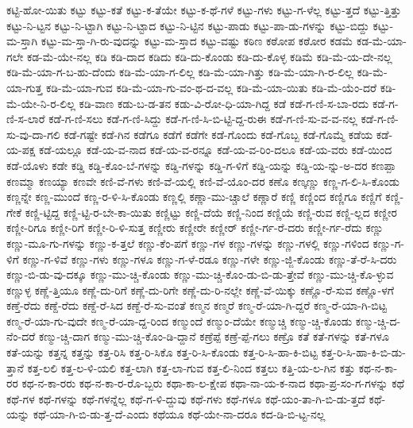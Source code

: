 {ಕಟ್ಟಿ-ಹೋ-ಯಿತು
ಕಟ್ಟು
ಕಟ್ಟು-ಕತೆ
ಕಟ್ಟು-ಕ-ತೆಯೇ
ಕಟ್ಟು-ಕ-ಥೆ-ಗಳೆ
ಕಟ್ಟು-ಗಳು
ಕಟ್ಟು-ಗ-ಳೆಲ್ಲ
ಕಟ್ಟು-ತ್ತದೆ
ಕಟ್ಟು-ತ್ತಿತ್ತು
ಕಟ್ಟು-ನಿ-ಟ್ಟನ
ಕಟ್ಟು-ನಿ-ಟ್ಟಾಗಿ
ಕಟ್ಟು-ನಿ-ಟ್ಟಾದ
ಕಟ್ಟು-ನಿ-ಟ್ಟಿನ
ಕಟ್ಟು-ಪಾಡು
ಕಟ್ಟು-ಪಾ-ಡು-ಗಳನ್ನು
ಕಟ್ಟು-ಬಿದ್ದು
ಕಟ್ಟು-ಮ-ಸ್ತಾಗಿ
ಕಟ್ಟು-ಮ-ಸ್ತಾ-ಗಿ-ರು-ವುದನ್ನು
ಕಟ್ಟು-ಮ-ಸ್ತಾದ
ಕಟ್ಟು-ವಷ್ಟು
ಕಠಿಣ
ಕಠೋಪ
ಕಠೋರ
ಕಡಮೆ
ಕಡ-ಮೆ-ಯಾ-ಗಲೇ
ಕಡ-ಮೆ-ಯೇ-ನಲ್ಲ
ಕಡಿ
ಕಡಿ-ದಾದ
ಕಡಿದು
ಕಡಿ-ದು-ಕೊಂಡು
ಕಡಿ-ದು-ಕೊಳ್ಳ
ಕಡಿಮೆ
ಕಡಿ-ಮೆ-ಯ-ದೇ-ನಲ್ಲ
ಕಡಿ-ಮೆ-ಯಾ-ಗ-ಬ-ಹು-ದೆಂದು
ಕಡಿ-ಮೆ-ಯಾ-ಗ-ಲಿಲ್ಲ
ಕಡಿ-ಮೆ-ಯಾ-ಗಿತ್ತು
ಕಡಿ-ಮೆ-ಯಾ-ಗಿ-ರ-ಲಿಲ್ಲ
ಕಡಿ-ಮೆ-ಯಾ-ಗುತ್ತ
ಕಡಿ-ಮೆ-ಯಾ-ಗುವ
ಕಡಿ-ಮೆ-ಯಾ-ಗು-ವಂ-ಥ-ದ-ವಲ್ಲ
ಕಡಿ-ಮೆ-ಯಾ-ಯಿತು
ಕಡಿ-ಮೆ-ಯೆಂ-ದರೆ
ಕಡಿ-ಮೆ-ಯೇ-ನಿ-ರ-ಲಿಲ್ಲ
ಕಡಿ-ವಾಣ
ಕಡು-ಬ-ಡ-ತನ
ಕಡು-ವಿ-ರೋ-ಧಿ-ಯಾ-ಗಿದ್ದ
ಕಡೆ
ಕಡೆ-ಗ-ಣಿ-ಸ-ಬಾ-ರದು
ಕಡೆ-ಗ-ಣಿ-ಸ-ಲಾರೆ
ಕಡೆ-ಗ-ಣಿ-ಸಲು
ಕಡೆ-ಗ-ಣಿ-ಸಿದ್ದು
ಕಡೆ-ಗ-ಣಿ-ಸಿ-ಬಿ-ಟ್ಟಿ-ದ್ದ-ರುಈ
ಕಡೆ-ಗ-ಣಿ-ಸು-ವ-ವ-ನಲ್ಲ
ಕಡೆ-ಗ-ಣಿ-ಸು-ವು-ದಾ-ಗಲಿ
ಕಡೆ-ಗಷ್ಟೇ
ಕಡೆ-ಗಿನ
ಕಡೆಗೂ
ಕಡೆಗೆ
ಕಡೆಗೇ
ಕಡೆ-ಗೊಂದು
ಕಡೆ-ಗೊಬ್ಬ
ಕಡೆ-ಗೊಮ್ಮೆ
ಕಡೆಯ
ಕಡೆ-ಯ-ಪಕ್ಷ
ಕಡೆ-ಯಲ್ಲೂ
ಕಡೆ-ಯ-ವ-ನಾದ
ಕಡೆ-ಯ-ವ-ರನ್ನೂ
ಕಡೆ-ಯ-ವ-ರಿಂ-ದಲೂ
ಕಡೆ-ಯ-ವರು
ಕಡೆ-ಯಿಂದ
ಕಡೆ-ಯೊಳು
ಕಡೇ
ಕಡ್ಡಿ
ಕಡ್ಡಿ-ಕೊಂ-ಬೆ-ಗಳನ್ನು
ಕಡ್ಡಿ-ಗಳನ್ನು
ಕಡ್ಡಿ-ಗ-ಳಿಗೆ
ಕಡ್ಡಿ-ಯನ್ನು
ಕಡ್ಡಿ-ಯ-ನ್ನು-ಅ-ದರ
ಕಣಪ್ಪಾ
ಕಣಮ್ಮಾ
ಕಣಯ್ಯಾ
ಕಣವೇ
ಕಣಿ-ವೆ-ಗಳು
ಕಣಿ-ವೆ-ಯಲ್ಲಿ
ಕಣಿ-ವೆ-ಯೊಂ-ದರ
ಕಣೊ
ಕಣ್ಕಣ್ಣು
ಕಣ್ಣ-ಗ-ಲಿ-ಸಿ-ಕೊಂಡು
ಕಣ್ಣನ್ನೇ
ಕಣ್ಣ-ಮುಂದೆ
ಕಣ್ಣ-ರ-ಳಿ-ಸಿ-ಕೊಂಡು
ಕಣ್ಣಲ್ಲಿ
ಕಣ್ಣಾ-ಮು-ಚ್ಚಾಲೆ
ಕಣ್ಣಾರೆ
ಕಣ್ಣಿ
ಕಣ್ಣಿಂದ
ಕಣ್ಣಿಗೂ
ಕಣ್ಣಿಗೆ
ಕಣ್ಣಿ-ಗೇಕೆ
ಕಣ್ಣಿ-ಟ್ಟಿದ್ದ
ಕಣ್ಣಿ-ಟ್ಟಿ-ರ-ಬೇ-ಕಾ-ಯಿತು
ಕಣ್ಣಿಟ್ಟು
ಕಣ್ಣಿ-ದೆಯೆ
ಕಣ್ಣಿ-ನಿಂದ
ಕಣ್ಣಿಯೆ
ಕಣ್ಣಿ-ರುವ
ಕಣ್ಣಿ-ಲ್ಲದ
ಕಣ್ಣೀರ
ಕಣ್ಣೀ-ರಿಗೂ
ಕಣ್ಣೀ-ರಿಗೆ
ಕಣ್ಣೀ-ರಿ-ಳಿ-ಸುತ್ತ
ಕಣ್ಣೀರು
ಕಣ್ಣೀರೇ
ಕಣ್ಣೀರ್
ಕಣ್ಣೀ-ರ್ಗ-ರೆ-ದರು
ಕಣ್ಣೀ-ರ್ಗ-ರೆದು
ಕಣ್ಣು
ಕಣ್ಣು-ಮೂ-ಗು-ಗಳನ್ನು
ಕಣ್ಣು-ಕ-ತ್ತಲೆ
ಕಣ್ಣು-ಕೆಂ-ಪಗೆ
ಕಣ್ಣು-ಗಳ
ಕಣ್ಣು-ಗಳನ್ನು
ಕಣ್ಣು-ಗಳಲ್ಲಿ
ಕಣ್ಣು-ಗಳಿಂದ
ಕಣ್ಣು-ಗ-ಳಿಗೆ
ಕಣ್ಣು-ಗ-ಳಿವೆ
ಕಣ್ಣು-ಗಳು
ಕಣ್ಣು-ಗಳೂ
ಕಣ್ಣು-ಗ-ಳೆ-ರಡೂ
ಕಣ್ಣು-ಗಳೇ
ಕಣ್ಣು-ಜ್ಜಿ-ಕೊಂಡು
ಕಣ್ಣು-ತೆ-ರೆ-ಸಿ-ದರು
ಕಣ್ಣು-ಬಿ-ಡು-ವು-ದಕ್ಕೂ
ಕಣ್ಣು-ಮು-ಚ್ಚಿ-ಕೊಂಡು
ಕಣ್ಣು-ಮು-ಚ್ಚಿ-ಕೊಂ-ಡು-ಬಿ-ಡು-ತ್ತೇವೆ
ಕಣ್ಣು-ಮು-ಚ್ಚಿ-ಕೊ-ಳ್ಳುವ
ಕಣ್ಣುಳ್ಳ
ಕಣ್ಣೆ-ತ್ತಿಯೂ
ಕಣ್ಣೆ-ದು-ರಿಗೆ
ಕಣ್ಣೆ-ದು-ರಿಗೇ
ಕಣ್ಣೆ-ದು-ರಿ-ನಲ್ಲೇ
ಕಣ್ಣೆ-ವೆ-ಯಿಕ್ಕು
ಕಣ್ಣೊ-ರೆ-ಸುವ
ಕಣ್ಣೊ-ಳಗೆ
ಕಣ್ತೆ-ರೆದು
ಕಣ್ದೆ-ರೆದು
ಕಣ್ದೆ-ರೆ-ಸಿದ
ಕಣ್ದೆ-ರೆ-ಸು-ವಂತೆ
ಕಣ್ಮನ
ಕಣ್ಮರೆ
ಕಣ್ಮ-ರೆ-ಯಾ-ಗಿ-ದ್ದರೆ
ಕಣ್ಮ-ರೆ-ಯಾ-ಗಿ-ಬಿಟ್ಟ
ಕಣ್ಮ-ರೆ-ಯಾ-ಗು-ವುದೇ
ಕಣ್ಮ-ರೆ-ಯಾ-ದ್ದ-ರಿಂದ
ಕಣ್ಮುಂದೆ
ಕಣ್ಮುಂ-ದೆಯೇ
ಕಣ್ಮುಚ್ಚಿ
ಕಣ್ಮು-ಚ್ಚಿ-ಕೊಂಡು
ಕಣ್ಮು-ಚ್ಚಿ-ದ-ನೆಂ-ದರೆ
ಕಣ್ಮು-ಚ್ಚಿ-ದಾಗ
ಕಣ್ಮು-ಮು-ಚ್ಚಿ-ಕೊಂ-ಡಿ-ದ್ದಾನೆ
ಕಣ್ರೆಪ್ಪೆ
ಕಣ್ರೆ-ಪ್ಪೆ-ಗಲು
ಕಣ್ರೊ
ಕತೆ
ಕತೆ-ಗಳನ್ನು
ಕತೆ-ಗಳೂ
ಕತೆ-ಯನ್ನು
ಕತ್ತನ್ನ
ಕತ್ತನ್ನು
ಕತ್ತ-ರಿಸಿ
ಕತ್ತ-ರಿ-ಸಿಕೊ
ಕತ್ತ-ರಿ-ಸಿ-ಕೊಂಡು
ಕತ್ತ-ರಿ-ಸಿ-ಹಾ-ಕಿ-ಬಿಟ್ಟ
ಕತ್ತ-ರಿ-ಸಿ-ಹಾ-ಕಿ-ಬಿ-ಡು-ತ್ತಾನೆ
ಕತ್ತ-ಲಲಿ
ಕತ್ತ-ಲ-ಳಿ-ಯಲಿ
ಕತ್ತ-ಲಾಗಿ
ಕತ್ತ-ಲಾ-ಗುವ
ಕತ್ತ-ಲಿ-ನಿಂದ
ಕತ್ತಲು
ಕತ್ತಿ-ಯ-ಲ-ಗಿನ
ಕತ್ತು
ಕಥ-ನ-ಕಾ-ರರ
ಕಥ-ನ-ಕಾ-ರರು
ಕಥ-ನ-ಕಾ-ರ-ರೊ-ಬ್ಬರು
ಕಥಾ-ಕಾ-ಲ-ಕ್ಷೇಪ
ಕಥಾ-ನಾ-ಯ-ಕ-ನಾದ
ಕಥಾ-ಪ್ರ-ಸಂ-ಗ-ಗಳನ್ನು
ಕಥೆ
ಕಥೆ-ಗಳ
ಕಥೆ-ಗಳನ್ನು
ಕಥೆ-ಗಳನ್ನೆಲ್ಲ
ಕಥೆ-ಗ-ಳಿ-ದ್ದುವು
ಕಥೆ-ಗಳು
ಕಥೆ-ಗಳೂ
ಕಥೆ-ಯಂ-ತಾ-ಗಿ-ಬಿ-ಡು-ತ್ತದೆ
ಕಥೆ-ಯನ್ನು
ಕಥೆ-ಯಾ-ಗಿ-ಬಿ-ಡು-ತ್ತ-ದೆ-ಎಂದು
ಕಥೆಯೂ
ಕಥೆ-ಯೇ-ನಾ-ದರೂ
ಕದ-ಡಿ-ಬಿ-ಟ್ಟ-ನಲ್ಲ
}
